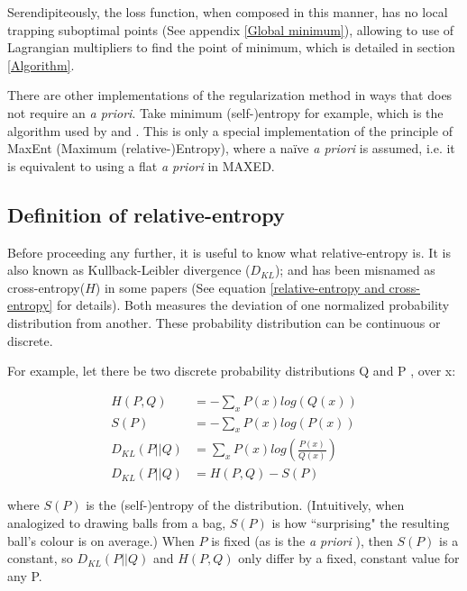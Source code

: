 \documentclass[a4paper, 12pt]{article}
\newcommand{\apriori}[0]{\textit{a priori} }
\begin{document}
    Serendipiteously, the loss function, when composed in this manner, has no local trapping suboptimal points (See appendix \ref{Global minimum}), allowing to use of Lagrangian multipliers to find the point of minimum, which is detailed in section \ref{Algorithm}.

    There are other implementations of the regularization method in ways that does not require an \textit{a priori}. Take minimum (self-)entropy for example, which is the algorithm used by \cite{cvachovec2008maximum} and \cite{maeda2013new}. This is only a special implementation of the principle of MaxEnt (Maximum (relative-)Entropy), where a na\"{i}ve \apriori is assumed, i.e. it is equivalent to using a flat \apriori in MAXED.

\subsection{Definition of relative-entropy}
    Before proceeding any further, it is useful to know what relative-entropy is. It is also known as Kullback-Leibler divergence ($D_{KL}$); and has been misnamed as cross-entropy($H$) in some papers\cite{MAXED1998Reginatto} (See equation \ref{relative-entropy and cross-entropy} for details). Both measures the deviation of one normalized probability distribution from another. These probability distribution can be continuous or discrete.

    For example, let there be two discrete probability distributions Q and P , over x:

    \begin{align}
    H(P,Q)    &=  - \sum_x P(x) log(Q(x))   \\
    S(P)      &=  - \sum_x P(x) log(P(x))   \\
    D_{KL}(P||Q) &= \sum_x P(x)log(\frac{P(x)}{Q(x)}) \label{relative-entropy definition}\\
    D_{KL}(P||Q) &= H(P,Q)-S(P) \label{relative-entropy and cross-entropy}
    \end{align}

    where $S(P)$ is the (self-)entropy of the distribution.
    (Intuitively, when analogized to drawing balls from a bag, $S(P)$ is how ``surprising" the resulting ball's colour is on average.)
    When $P$ is fixed (as is the \apriori), then $S(P)$ is a constant, so $D_{KL}(P||Q)$ and $H(P,Q)$ only differ by a fixed, constant value for any P.
    
\end{document}
